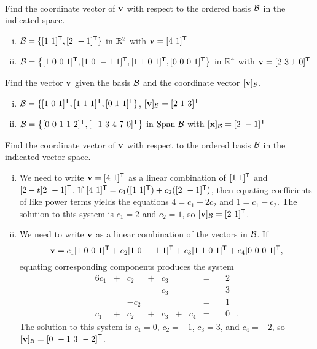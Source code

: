 \label{sec:cob_exam}

\ExampleIntro

\begin{example} ~
	\ba
	\item Find the coordinate vector of $\mathbf{v}$ with respect to the ordered basis $\mathcal{B}$ in the indicated space.
		\begin{enumerate}[i.]
		\item $\CB = \{[1 \ 1]^{\tr}, [2 \ -1]^{\tr}\}$ in $\mathbb{R}^2$ with $\vv = [4 \ 1]^{\tr}$
	
		\item $\mathcal{B} = \left\{[1 \ 0 \ 0 \ 1]^{\mathsf{T}}, [1 \  0 \ -1 \ 1]^{\mathsf{T}}, [1 \ 1 \ 0 \ 1]^{\mathsf{T}},  [0 \ 0 \ 0  \ 1]^{\mathsf{T}} \right\}$ in $\mathbb{R}^4$ with $\mathbf{v} = [2 \ 3 \ 1 \ 0]^{\mathsf{T}}$
		\end{enumerate}
	
	\item Find the vector $\mathbf{v}$ given the basis $\mathcal{B}$ and the coordinate vector $[\mathbf{v}]_{\mathcal{B}}$.
		\begin{enumerate}[i.]
		\item $\CB = \{[1\ 0 \ 1]^{\tr}, [1 \ 1 \ 1]^{\tr}, [0 \ 1 \ 1]^{\tr}\}$, $[\mathbf{v}]_{\mathcal{B}} = [2 \ 1 \ 3]^{\mathsf{T}}$
		
		\item $\CB = \left\{[0 \ 0 \ 1 \ 1 \ 2]^{\tr}, [-1 \ 3 \ 4 \ 7 \ 0]^{\tr}\right\}$ in $\text{Span} \ \mathcal{B}$ with $[\mathbf{x}]_{\mathcal{B}} = [2 \ -1]^{\mathsf{T}}$
		
		\end{enumerate}
	
	\ea

\ExampleSolution

	\ba
	\item Find the coordinate vector of $\mathbf{v}$ with respect to the ordered basis $\mathcal{B}$ in the indicated vector space.
		\begin{enumerate}[i.]
		\item We need to write $\vv =[4 \ 1]^{\tr}$ as a linear combination of $[1 \ 1]^{\mathsf{T}}$ and $[2-t]2 \ -1]^{\mathsf{T}}$. If $[4 \ 1]^{\tr} = c_1([1 \ 1]^{\tr}) + c_2([2 \ -1]^{\tr})$, then equating coefficients of like power terms yields the equations $4 = c_1 +2c_2$ and $1 = c_1-c_2$. The solution to this system is $c_1 = 2$ and $c_2 = 1$, so $[\vv]_{\CB} = [2 \ 1]^{\tr}$.  
		
			
		\item We need to write $\mathbf{v}$ as a linear combination of the vectors in $\mathcal{B}$. If 
\[\mathbf{v} = c_1[1 \ 0 \ 0 \ 1]^{\mathsf{T}} + c_2 [1 \  0 \ -1 \ 1]^{\mathsf{T}} + c_3 [1 \ 1 \ 0 \ 1]^{\mathsf{T}} + c_4  [0 \ 0 \ 0  \ 1]^{\mathsf{T}},\]
equating corresponding components produces the system 
\begin{alignat*}{6}
{}c_1 	&{}+{}	&{}c_2	&{}+{}	&{}c_3	&{}{}		&{}		&{}={}	&\ {}&2&{}\\
{}		&{}{}		&{}		&{}{}		&{}c_3	&{}{}		&{}		&{}={} 	&\ {}&3&{} \\
{}		&{}{}		&{-}c_2	&{}{}		&{}		&{}{}		&{}		&{}={} 	&\ {}&1&{} \\
{}c_1		&{}+{}	&{}c_2	&{}+{}	&{}c_3	&{}+{}	&{}c_4	&{}={}	& \ {}&0&{.}
\end{alignat*}
The solution to this system is $c_1 = 0$, $c_2 = -1$, $c_3 = 3$, and $c_4 = -2$, so $[\vv]_{\CB} = [0 \ -1 \ 3 \ -2]^{\tr}$.


\end{enumerate}
\end{example}
